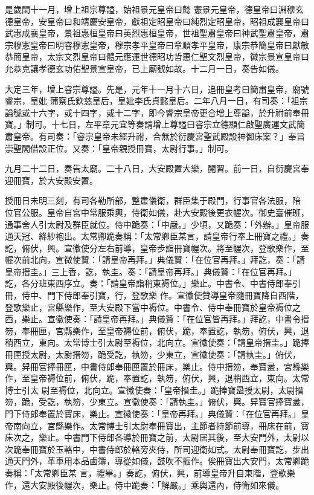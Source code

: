 \begin{pinyinscope}
 是歲閏十一月，增上祖宗尊謚，始祖景元皇帝曰懿
 憲景元皇帝，德皇帝曰淵穆玄德皇帝，安皇帝曰和靖慶安皇帝，獻祖定昭皇帝曰純烈定昭皇帝，昭祖成襄皇帝曰武惠成襄皇帝，景祖惠桓皇帝曰英烈惠桓皇帝，世祖聖肅皇帝曰神武聖肅皇帝，肅宗穆憲皇帝曰明睿穆憲皇帝，穆宗孝平皇帝曰章順孝平皇帝，康宗恭簡皇帝曰獻敏恭簡皇帝，太宗文烈皇帝曰體元應運世德昭功哲惠仁聖文烈皇帝，徽宗景宣皇帝曰允恭克讓孝德玄功佑聖景宣皇帝，已上廟號如故。十二月一日，奏告如儀。



 大定三年，增上睿宗尊謚。先是，元年十一月十六日，追冊皇考曰簡肅皇帝，廟號睿宗，皇妣
 蒲察氏欽慈皇后，皇妣李氏貞懿皇后。二年八月一日，有司奏：「祖宗謚號或十六字，或十四字，或十二字，即今睿宗皇帝更合增上尊謚，於升祔前奉冊寶。」制可。十七日，左平章元宜等奏請增上尊謚曰睿宗立德顯仁啟聖廣運文武簡肅皇帝。有司奏：「睿宗皇帝未經升祔，合無於衍慶宮聖武殿設神御床案？」奉旨崇聖閣借設正位。又奏：「皇帝親授冊寶，太尉行事。」制可。



 九月二十二日，奏告太廟。二十八日，大安殿置大樂，閱習。前一日，自衍慶宮奉迎冊寶，於大安殿安置。



 授冊日未明三刻，有司各勒所部，整肅儀衛，群臣集于殿門，行事官各法服，陪
 位官公服。皇帝自宮中常服乘輿，侍衛如儀，赴大安殿後更衣幄次。御史臺催班，通事舍人引太尉及群臣就位。侍中跪奏：「中嚴。」少頃，又跪奏：「外辦。」皇帝服通天冠、絳紗袍出。太常卿跪奏稱：「太常卿臣某言，請皇帝行奉上冊寶之禮。」奏訖，俯伏，興。宣徽使分左右前導，皇帝步詣冊寶幄次。將至幄次，登歌樂作，至幄次前北向，宣微使贊：「請皇帝再拜。」典儀贊：「在位官再拜。」拜訖，奏：「請皇帝搢圭。」三上香，訖，執圭。奏：「請皇帝再拜。」典儀贊：「在位官再拜。」訖，各分班東西序立。奏：「請皇帝詣稍東褥位。」樂止。中書令、中書侍郎奉引冊，侍中、門下侍郎奉引寶，行，登歌樂
 作。宣徽使贊導皇帝隨冊寶降自西階，登歌樂止，宮縣樂作，至大安殿下當中褥位。中書令、侍中奉冊寶於皇帝褥位之西，樂止。宣徽使奏：「請皇帝再拜。」典儀贊：「在位官皆再拜。」拜訖，中書令搢笏，奉冊匣，宮縣樂作，至皇帝褥位前，俯伏，跪，奉置訖，執笏，俯伏，興，退稍西立，東向。太常博士引太尉至褥位，北向立。宣徽使奏：「請皇帝搢圭。」跪捧冊匣授太尉，太尉搢笏，跪受訖，執笏，少東立，宣徽使奏：「請執圭。」俯伏，興。舁冊官捧冊匣，中書侍郎奉冊匣置於冊床，樂止。侍中搢笏，奉寶盝，宮縣樂作，至皇帝褥位前，俯伏，跪，奉置訖，執笏，俯伏，興，退稍西立，東向。太常博士引太
 尉至褥位，北向立。宣徽使奏：「皇帝搢圭。」跪捧寶盝授太尉，太尉搢笏，跪，受訖，執笏，少東立。宣徽使奏：「請執圭。」俯伏，興。舁寶官捧寶盝，門下侍郎奉置於寶床，樂止。宣徽使奏：「皇帝再拜。」典儀贊：「在位官再拜。」皇帝南向立，宮縣樂作。太常博士引太尉奉冊寶出，主節者持節前導，冊床在前，寶床次之，樂止。中書門下侍郎各導於冊寶之前，太尉居其後，至大安門外，太尉以次跪奉冊寶於玉輅中，中書侍郎於輅旁夾侍，所司迎衛如式。太尉奉冊寶訖，步出通天門外，革車用本品鹵簿，導從如儀，鼓吹不振作。俟冊寶出大安門，太常卿跪奏稱：「太常卿臣某
 言，禮畢。」奏訖，俯伏，興，前導皇帝升自東階，登歌樂作，還大安殿後幄次，樂止。侍中跪奏：「解嚴。」乘輿還內，侍衛如來儀。




\end{pinyinscope}
